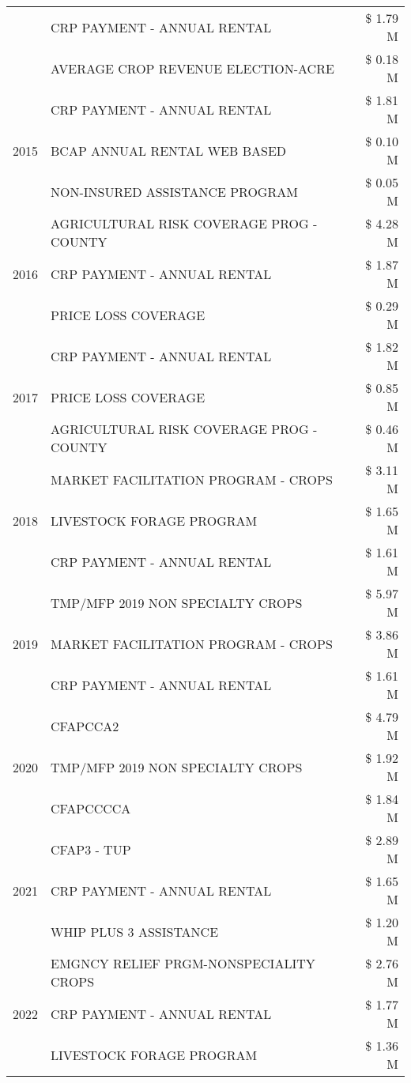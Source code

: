 \begin{tabular}{llr}
 & CRP PAYMENT - ANNUAL RENTAL & \$ 1.79 M \\
 & AVERAGE CROP REVENUE ELECTION-ACRE & \$ 0.18 M \\
\cline{1-3}
\multirow[t]{3}{*}{2015} & CRP PAYMENT - ANNUAL RENTAL & \$ 1.81 M \\
 & BCAP ANNUAL RENTAL WEB BASED & \$ 0.10 M \\
 & NON-INSURED ASSISTANCE PROGRAM & \$ 0.05 M \\
\cline{1-3}
\multirow[t]{3}{*}{2016} & AGRICULTURAL RISK COVERAGE PROG - COUNTY & \$ 4.28 M \\
 & CRP PAYMENT - ANNUAL RENTAL & \$ 1.87 M \\
 & PRICE LOSS COVERAGE & \$ 0.29 M \\
\cline{1-3}
\multirow[t]{3}{*}{2017} & CRP PAYMENT - ANNUAL RENTAL & \$ 1.82 M \\
 & PRICE LOSS COVERAGE & \$ 0.85 M \\
 & AGRICULTURAL RISK COVERAGE PROG - COUNTY & \$ 0.46 M \\
\cline{1-3}
\multirow[t]{3}{*}{2018} & MARKET FACILITATION PROGRAM - CROPS & \$ 3.11 M \\
 & LIVESTOCK FORAGE PROGRAM & \$ 1.65 M \\
 & CRP PAYMENT - ANNUAL RENTAL & \$ 1.61 M \\
\cline{1-3}
\multirow[t]{3}{*}{2019} & TMP/MFP 2019 NON SPECIALTY CROPS & \$ 5.97 M \\
 & MARKET FACILITATION PROGRAM - CROPS & \$ 3.86 M \\
 & CRP PAYMENT - ANNUAL RENTAL & \$ 1.61 M \\
\cline{1-3}
\multirow[t]{3}{*}{2020} & CFAPCCA2 & \$ 4.79 M \\
 & TMP/MFP 2019 NON SPECIALTY CROPS & \$ 1.92 M \\
 & CFAPCCCCA & \$ 1.84 M \\
\cline{1-3}
\multirow[t]{3}{*}{2021} & CFAP3 - TUP & \$ 2.89 M \\
 & CRP PAYMENT - ANNUAL RENTAL & \$ 1.65 M \\
 & WHIP PLUS 3 ASSISTANCE & \$ 1.20 M \\
\cline{1-3}
\multirow[t]{3}{*}{2022} & EMGNCY RELIEF PRGM-NONSPECIALITY CROPS & \$ 2.76 M \\
 & CRP PAYMENT - ANNUAL RENTAL & \$ 1.77 M \\
 & LIVESTOCK FORAGE PROGRAM & \$ 1.36 M \\
\cline{1-3}
\bottomrule
\end{tabular}
